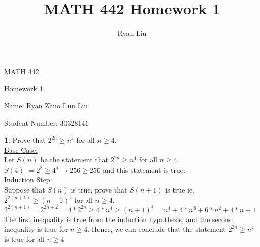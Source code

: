 \documentclass[12pt,a4paper]{article}
\author{Ryan Liu}
\title{MATH 442 Homework 1}
\theoremstyle{definition}
\newtheorem{problem}{}
\begin{document}
\begin{center}
{\huge MATH 442 \par}
{\Large Homework  1  \par}
{\normalsize Name: Ryan Zhuo Lun Liu \par}
{\normalsize Student Number: 30328141 \par}
\end{center}

\begin{problem}
Prove that $2^{2n} \geq n^4$ for all $n\geq4$. \\

\underline{Base Case:} \\
Let $S(n)$ be the statement that $2^{2n} \geq n^4$ for all $n\geq4$. \\
$S(4)$ $= 2^{8} \geq 4^4 \rightarrow 256 \geq 256$ and this statement is true. \\

\underline{Induction Step:} \\
Suppose that $S(n)$ is true, prove that $S(n + 1)$ is true ie. $2^{2(n + 1)} \geq (n + 1)^4$ for all $ n \geq 4$. \\

$2^{2(n + 1)} = 2^{2n + 2} = 4 * 2^{2n} \geq 4 * n^4 \geq (n + 1)^4 = n^4 + 4*n^3 + 6*n^2 + 4*n + 1$ \\

The first inequality is true from the induction hypothesis, and the second inequality is true for $n \geq 4$. Hence, we can conclude that the statement $2^{2n} \geq n^4$ is true for all $n \geq 4$

\end{problem}
\end{document}
